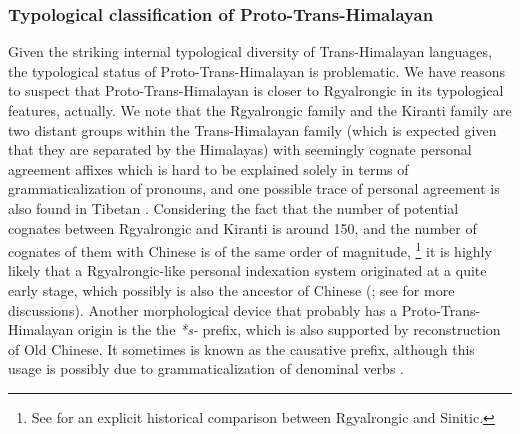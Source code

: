 \documentclass[UTF8, a4paper, oneside, scheme=plain, 12pt]{ctexrep}
\newcommand{\form}[1]{\emph{#1}}
\begin{document}
\subsubsection{Typological classification of Proto-Trans-Himalayan}
Given the striking internal typological diversity of Trans-Himalayan languages,
the typological status of Proto-Trans-Himalayan is problematic.
We have reasons to suspect that Proto-Trans-Himalayan is closer to Rgyalrongic in its typological features, actually.
We note that the Rgyalrongic family and the Kiranti family are two distant groups within the Trans-Himalayan family
(which is expected given that they are separated by the Himalayas)
with seemingly cognate personal agreement affixes
which is hard to be explained solely in terms of grammaticalization of pronouns,
and one possible trace of personal agreement is also found in Tibetan
\citep{jacques2012agreement,jacques2010possible,jacques2016tangut}.
Considering the fact that the number of potential cognates between Rgyalrongic and Kiranti is around 150,
and the number of cognates of them with Chinese is of the same order of magnitude,%
\footnote{
    See \citet{shuya2019study} for an explicit historical comparison between Rgyalrongic and Sinitic.
}
it is highly likely that a Rgyalrongic-like personal indexation system originated at a quite early stage,
which possibly is also the ancestor of Chinese
(\citealt{jacques2012agreement}; see  for more discussions).
Another morphological device that probably has a Proto-Trans-Himalayan origin is the the \form{*s-} prefix,
which is also supported by reconstruction of Old Chinese.
It sometimes is known as the causative prefix,
although this usage is possibly due to grammaticalization of denominal verbs
\citep{jacques2015origin}.
\end{document}
